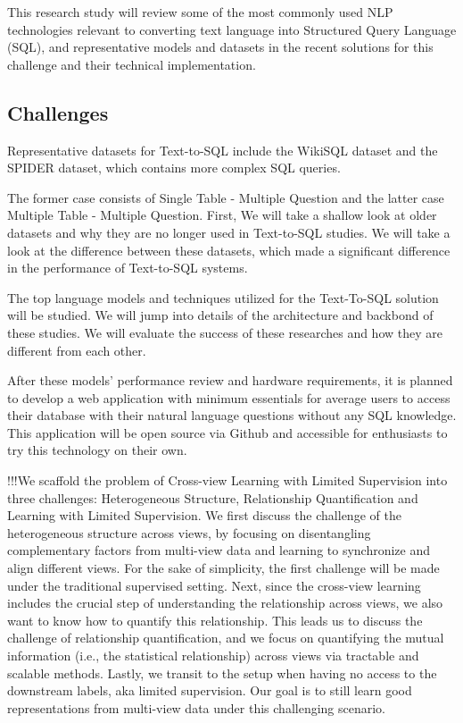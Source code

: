 This research study will review some of the most commonly used NLP technologies relevant to converting text language into Structured Query Language (SQL), and representative models and datasets in the recent solutions for this challenge and their technical implementation.

\subsection{Challenges}

Representative datasets for Text-to-SQL include the WikiSQL\cite{zhong_seq2sql_2017} dataset and
the SPIDER\cite{yu_spider_2019} dataset, which contains more complex SQL queries.

The former case consists of Single Table - Multiple Question and the latter case Multiple Table - Multiple Question.
First, We will take a shallow look at older datasets and why they are no longer used in Text-to-SQL studies.
We will take a look at the difference between these datasets, which made a significant difference in the performance of Text-to-SQL systems.

The top language models and techniques utilized for the Text-To-SQL solution will be studied. We will jump into details of the architecture and backbond of these studies. We will evaluate the success of these researches and how they are different from each other.

After these models' performance review and hardware requirements, it is planned to develop a web application with minimum essentials for average users to access their database with their natural language questions without any SQL knowledge. This application will be open source via Github and accessible for enthusiasts to try this technology on their own.


!!!We scaffold the problem of Cross-view Learning with Limited Supervision into three challenges: Heterogeneous Structure, Relationship Quantification and Learning with Limited Supervision. We first
discuss the challenge of the heterogeneous structure across views, by focusing on disentangling complementary factors from multi-view data and learning to synchronize and align different views. For the sake
of simplicity, the first challenge will be made under the traditional supervised setting. Next, since the
cross-view learning includes the crucial step of understanding the relationship across views, we also want to
know how to quantify this relationship. This leads us to discuss the challenge of relationship quantification,
and we focus on quantifying the mutual information (i.e., the statistical relationship) across views via
tractable and scalable methods. Lastly, we transit to the setup when having no access to the downstream
labels, aka limited supervision. Our goal is to still learn good representations from multi-view data under
this challenging scenario.

